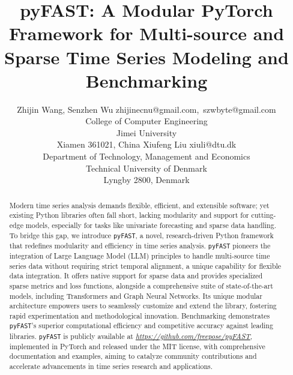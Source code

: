 \documentclass[twoside,11pt]{article}
\begin{document}
\title{pyFAST: A Modular PyTorch Framework for Multi-source and Sparse Time Series Modeling and Benchmarking}


\author{
    \name Zhijin Wang, Senzhen Wu \email zhijinecnu@gmail.com,~szwbyte@gmail.com \\
    \addr College of Computer Engineering\\
    Jimei University\\
    Xiamen 361021, China
    \AND
    \name Xiufeng Liu \email xiuli@dtu.dk \\
    \addr Department of Technology, Management and Economics\\
    Technical University of Denmark\\
    Lyngby 2800, Denmark
}


\maketitle

\begin{abstract}
Modern time series analysis demands flexible, efficient, and extensible software; yet existing Python libraries often fall short, lacking modularity and support for cutting-edge models, especially for tasks like univariate forecasting and sparse data handling. To bridge this gap, we introduce \texttt{pyFAST}, a novel, research-driven Python framework that redefines modularity and efficiency in time series analysis. \texttt{pyFAST} pioneers the integration of Large Language Model (LLM) principles to handle multi-source time series data without requiring strict temporal alignment, a unique capability for flexible data integration. It offers native support for sparse data and provides specialized sparse metrics and loss functions, alongside a comprehensive suite of state-of-the-art models, including Transformers and Graph Neural Networks. Its unique modular architecture empowers users to seamlessly customize and extend the library, fostering rapid experimentation and methodological innovation. Benchmarking demonstrates \texttt{pyFAST}'s superior computational efficiency and competitive accuracy against leading libraries. \texttt{pyFAST} is publicly available at \href{https://github.com/freepose/pyFAST}{\textit{https://github.com/freepose/pyFAST}}, implemented in PyTorch and released under the MIT license, with comprehensive documentation and examples, aiming to catalyze community contributions and accelerate advancements in time series research and applications.
\end{abstract}
\end{document}
